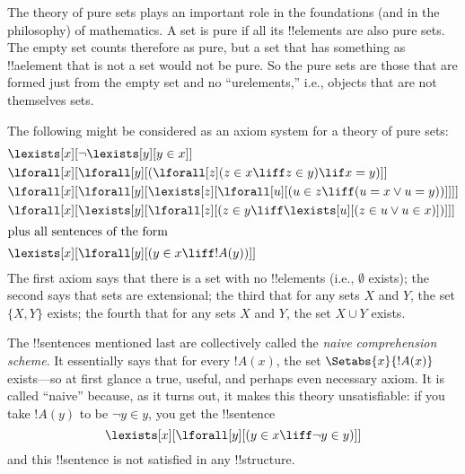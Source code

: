 \documentclass[../../include/open-logic-section]{subfiles}
\begin{document}
\begin{ex}
The theory of pure sets plays an important role in the foundations
(and in the philosophy) of mathematics.  A set is pure if all its
!!{element}s are also pure sets.  The empty set counts therefore as
pure, but a set that has something as !!a{element} that is not a set
would not be pure.  So the pure sets are those that are formed just
from the empty set and no ``urelements,'' i.e., objects that are not
themselves sets.

The following might be considered as an axiom system for a theory of
pure sets:
\begin{align*}
& \lexists[x][\lnot \lexists[y][y \in x]]\\
& \lforall[x][\lforall[y][(\lforall[z](z \in x \liff z \in y) \lif x =
      y)]]\\
& \lforall[x][\lforall[y][\lexists[z][\lforall[u][(u \in z \liff (u =
          x \lor u = y))]]]]\\
& \lforall[x][\lexists[y][\lforall[z][(z \in y \liff \lexists[u][(z \in
        u \lor u \in x)])]]]\\
\intertext{plus all sentences of the form} &
\lexists[x][\lforall[y][(y \in x \liff !A(y))]]
\end{align*}
The first axiom says that there is a set with no !!{element}s (i.e.,
$\emptyset$ exists); the second says that sets are extensional; the
third that for any sets $X$ and $Y$, the set $\{X, Y\}$ exists; the
fourth that for any sets $X$ and $Y$, the set $X \cup Y$ exists.

The !!{sentence}s mentioned last are collectively called the
\emph{naive comprehension scheme}.  It essentially says that for every
$!A(x)$, the set $\Setabs{x}{!A(x)}$ exists---so at first glance a
true, useful, and perhaps even necessary axiom.  It is called ``naive''
because, as it turns out, it makes this theory unsatisfiable: if you
take $!A(y)$ to be $\lnot y \in y$, you get the !!{sentence}
\[
\lexists[x][\lforall[y][(y \in x \liff \lnot y \in y)]]
\]
and this !!{sentence} is not satisfied in any !!{structure}.
\end{ex}
\end{document}
